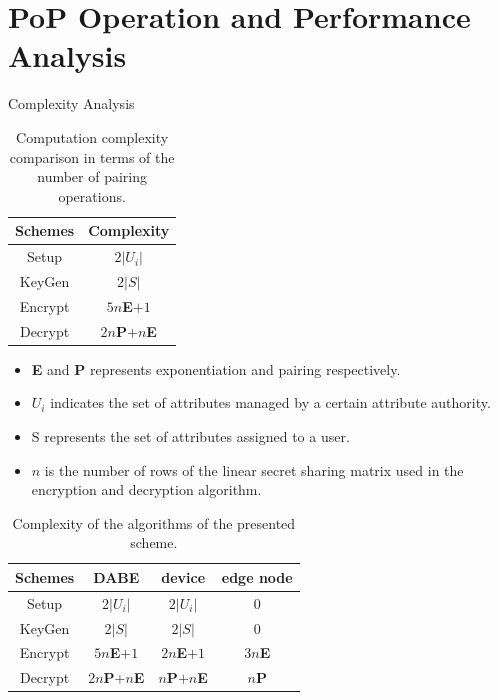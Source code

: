 \documentclass[11pt]{beamer}
\begin{document}
\section{PoP Operation and Performance Analysis}
\begin{frame}[allowframebreaks]{Complexity Analysis}
\begin{table}
\begin{tabular}{|c|c|}
\hline 
Schemes & Complexity \\ 
\hline 
Setup & $2|U_i|$ \\ 
\hline 
KeyGen & $2|S|$ \\ 
\hline 
Encrypt & $5n$\textbf{E}$+1$ \\ 
\hline 
Decrypt & $2n$\textbf{P}$+ n$\textbf{E} \\ 
\hline 
\end{tabular}
\caption{Computation complexity comparison in terms of the number of pairing operations.}
\label{tab:compcomplex1}
\end{table}

\begin{itemize}
\item \textbf{E} and \textbf{P} represents exponentiation and pairing respectively.
\item $U_i$ indicates the set of attributes managed by a certain attribute authority.
\item S represents the set of attributes assigned to a user.
\item $n$ is the number of rows of the linear secret sharing matrix used in the encryption and decryption algorithm.
\end{itemize}

\begin{table}
\begin{tabular}{|c|c|c|c|}
\hline 
Schemes & DABE & device & edge node \\ 
\hline 
Setup & $2|U_i|$ & $2|U_i|$ & 0 \\ 
\hline 
KeyGen & $2|S|$ & $2|S|$ & 0 \\ 
\hline 
Encrypt & $5n$\textbf{E}$+1$ & $2n$\textbf{E}$+1$ & $3n$\textbf{E} \\ 
\hline 
Decrypt & $2n$\textbf{P}$+ n$\textbf{E} & $n$\textbf{P}$+ n$\textbf{E} & $n$\textbf{P} \\ 
\hline 
\end{tabular} 
\caption{Complexity of the algorithms of the presented scheme.}
\label{tab:compcomplex2}

\end{table}


\end{frame}
\end{document}
